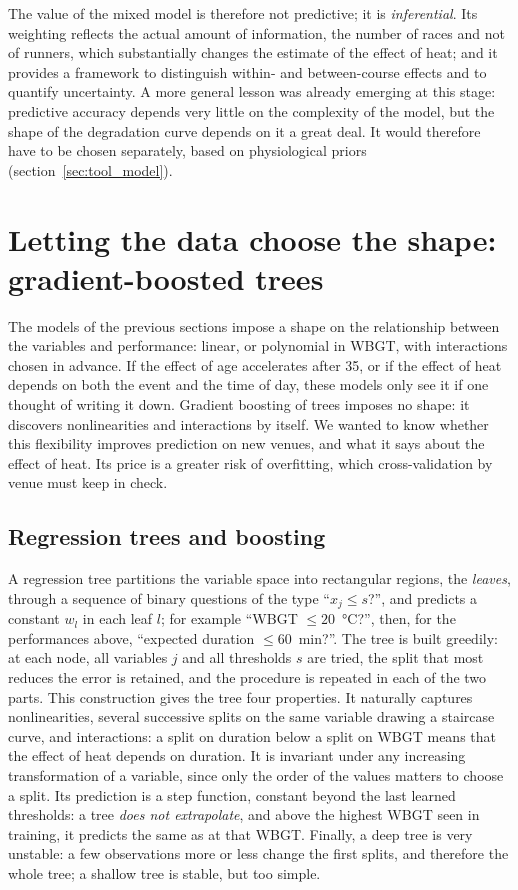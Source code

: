 \documentclass[11pt,a4paper]{article}
\begin{document}
The value of the mixed model is therefore not predictive; it is \emph{inferential}. Its weighting reflects the actual
amount of information, the number of races and not of runners, which substantially changes the estimate of the effect
of heat; and it provides a framework to distinguish within- and between-course effects and to quantify uncertainty. A
more general lesson was already emerging at this stage: predictive accuracy depends very little on the complexity of
the model, but the shape of the degradation curve depends on it a great deal. It would therefore have to be chosen
separately, based on physiological priors (section~\ref{sec:tool_model}).

\section{Letting the data choose the shape: gradient-boosted trees}\label{sec:boosting}

The models of the previous sections impose a shape on the relationship between the variables and performance: linear,
or polynomial in WBGT, with interactions chosen in advance. If the effect of age accelerates after 35, or if the effect
of heat depends on both the event and the time of day, these models only see it if one thought of writing it down.
Gradient boosting of trees imposes no shape: it discovers nonlinearities and interactions by itself. We wanted to know
whether this flexibility improves prediction on new venues, and what it says about the effect of heat. Its price is a
greater risk of overfitting, which cross-validation by venue must keep in check.

\subsection{Regression trees and boosting}\label{sec:trees}

A regression tree partitions the variable space into rectangular regions, the \emph{leaves}, through a sequence of
binary questions of the type ``$x_j \leq s$?'', and predicts a constant $w_l$ in each leaf $l$; for example ``WBGT
$\le 20$~°C?'', then, for the performances above, ``expected duration $\le 60$~min?''. The tree is built greedily: at
each node, all variables $j$ and all thresholds $s$ are tried, the split that most reduces the error is retained, and
the procedure is repeated in each of the two parts. This construction gives the tree four properties. It naturally
captures nonlinearities, several successive splits on the same variable drawing a staircase curve, and interactions:
a split on duration below a split on WBGT means that the effect of heat depends on duration. It is invariant under any
increasing transformation of a variable, since only the order of the values matters to choose a split. Its
prediction is a step function, constant beyond the last learned thresholds: a tree \emph{does not extrapolate}, and
above the highest WBGT seen in training, it predicts the same as at that WBGT. Finally, a deep tree is very unstable:
a few observations more or less change the first splits, and therefore the whole tree; a shallow tree is stable, but
too simple.
\end{document}
